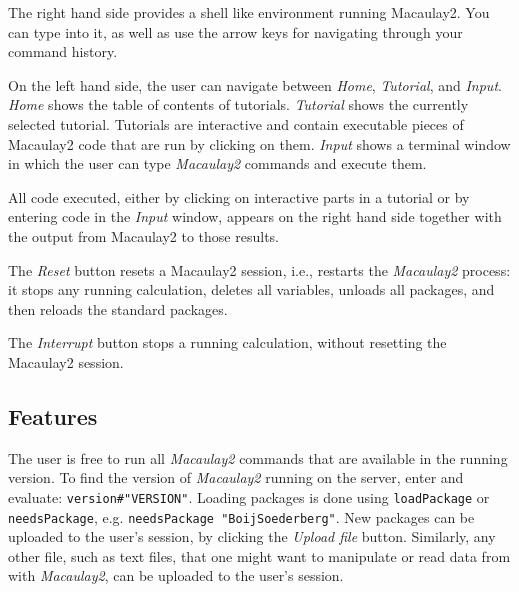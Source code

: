 \documentclass[twocolumn]{article}
\def\M2{{\it Macaulay2}}
\begin{document}
The right hand side provides a shell like environment running
Macaulay2. You can type into it, as well as use the arrow keys for
navigating through your command history.

On the left hand side, the user can navigate between {\it Home}, {\it
  Tutorial}, and {\it Input}. {\it Home} shows the table of contents
of tutorials. {\it Tutorial} shows the currently selected
tutorial. Tutorials are interactive and contain executable pieces of
Macaulay2 code that are run by clicking on them. {\it Input} shows a
terminal window in which the user can type {\it Macaulay2} commands and execute them.

All code executed, either by clicking on interactive parts in a
tutorial or by entering code in the {\it Input} window, appears on the
right hand side together with the output from Macaulay2 to those
results.

The {\it Reset} button resets a Macaulay2 session, i.e., restarts 
the \M2 process: it stops any running calculation, deletes all variables, 
unloads all packages, and then reloads the standard packages.

The {\it Interrupt} button stops a running calculation, without
resetting the Macaulay2 session.

\subsection{Features}

The user is free to run all \M2 commands that are available in the
running version. To find the version of \M2 running on the server,
enter and evaluate: {\tt version\#"VERSION"}.  Loading packages is
done using {\tt loadPackage} or {\tt needsPackage}, e.g. {\tt needsPackage "BoijSoederberg"}.  
New packages can be
uploaded to the user's session, by clicking the {\it Upload file}
button. Similarly, any other file, such as text files, that one might
want to manipulate or read data from with \M2, can be uploaded to
the user's session.

\end{document}
